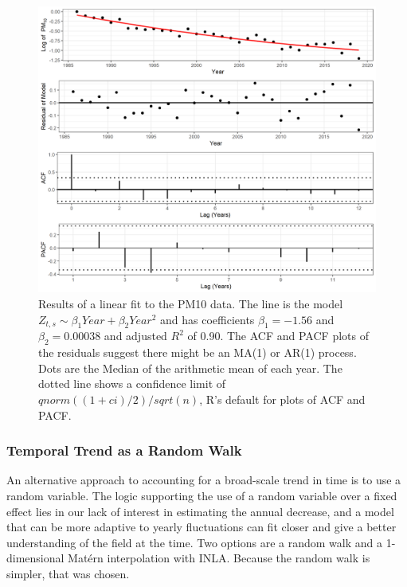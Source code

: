 \begin{figure}[ht]
\centering
\includegraphics[width = \textwidth]{Figures/explore_ts_exp_quad_fit.png}
\caption{Results of a linear fit to the PM10 data.  The line is the model $Z_{t,s} \sim \beta_1 Year+ \beta_2 Year^2$ and has coefficients $\beta_1 = -1.56$ and $\beta_2 = 0.00038$ and adjusted $R^2$ of  0.90.  The \ac{ACF} and \ac{PACF} plots of the residuals suggest there might be an MA(1) or AR(1) process.  Dots are the Median of the arithmetic mean of each year. The dotted line shows a confidence limit of $qnorm((1 + ci)/2)/sqrt(n)$, R's default for plots of ACF and PACF. }
\label{fig:explore_ts_exp_quad_fit}
\end{figure}

\subsubsection*{Temporal Trend as a Random Walk} \label{subsubsec:RWexploration}
An alternative approach to accounting for a broad-scale trend in time is to use a random variable.  The logic supporting the use of a random variable over a fixed effect lies in our lack of interest in estimating the annual decrease, and a model that can be more adaptive to yearly fluctuations can fit closer and give a better understanding of the field at the time.  Two options are a random walk and a 1-dimensional Mat\'{e}rn interpolation with \ac{INLA}.  Because the random walk is simpler, that was chosen.

